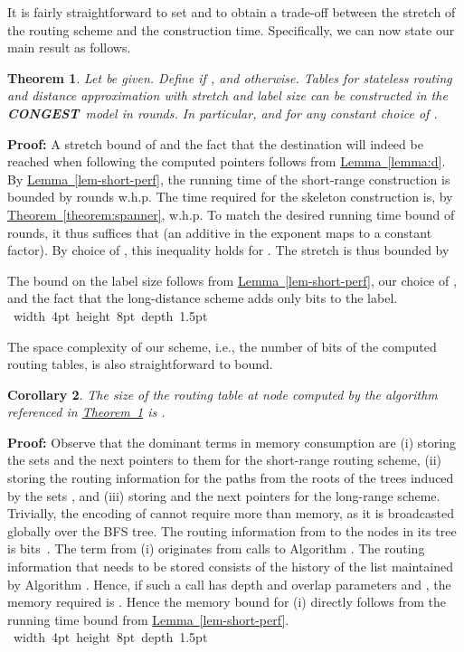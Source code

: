 \documentclass[letterpaper,11pt]{article}
\newcommand{\namedref}[2]{\hyperref[#2]{#1~\ref*{#2}}}
\newcommand{\theoremref}[1]{\namedref{Theorem}{#1}}
\newcommand{\lemmaref}[1]{\namedref{Lemma}{#1}}
\newtheorem{theorem}{Theorem}[section]
\newtheorem{corollary}[theorem]{Corollary}
\newcommand{\blackslug}{\hbox{\hskip 1pt \vrule width 4pt height 8pt
depth 1.5pt \hskip 1pt}}
\newcommand{\QED}{\quad\blackslug\lower 8.5pt\null\par}
\newenvironment{proof}[1][Proof:]{\noindent \textbf{#1}\xspace}{\QED}
\newcommand{\CONGEST}{\textbf{CONGEST}}
\begin{document}
It is fairly straightforward to set  and  to obtain a trade-off between 
the stretch of the routing scheme and the construction time. Specifically, we
can now state our main result as follows.
\begin{theorem}\label{thm-routing}
Let  be given. Define  if
, and  otherwise. Tables for stateless
routing and distance approximation with stretch
 and label size  can
be constructed in the \CONGEST\ model in  rounds.
In particular,  and  for any constant choice of .
\end{theorem}
\begin{proof}
A stretch bound of  and the fact that the destination will indeed be
reached when following the computed pointers follows from \lemmaref{lemma:d}.
By \lemmaref{lem-short-perf}, the running time of the short-range construction
is bounded by  rounds w.h.p. The time
required for the skeleton construction is, by \theoremref{theorem:spanner},
 w.h.p. To match the desired running time
bound of  rounds, it thus suffices that
 (an additive  in
the exponent maps to a constant factor). By choice of ,
this inequality holds for . The stretch
is thus bounded by


The bound on the label size follows from \lemmaref{lem-short-perf}, our
choice of , and the fact that the long-distance scheme adds only  bits to the label.
\end{proof}

The space complexity of our scheme, i.e., the number of bits of the computed
routing tables, is also straightforward to bound.

\begin{corollary}\label{coro:space}
The size of the routing table at node  computed by the algorithm referenced
in \theoremref{thm-routing} is .
\end{corollary}
\begin{proof}
Observe that the dominant terms in memory consumption are (i) storing the sets
 and the next pointers to them for the short-range routing scheme, (ii)
storing the routing information for the paths from the roots  of the
trees induced by the sets , and (iii) storing  and the
next pointers for the long-range scheme. Trivially, the encoding of
 cannot require more than  memory, as
it is broadcasted globally over the BFS tree. The routing information from
 to the nodes in its tree is  bits~\cite{TZ-routing}. The
term from (i) originates from calls to Algorithm . The routing information
that needs to be stored consists of the history of the list maintained by
Algorithm . Hence, if such a call has depth and overlap parameters  and
, the memory required is . Hence the memory bound
for (i) directly follows from the running time bound from
\lemmaref{lem-short-perf}.
\end{proof}
\end{document}
